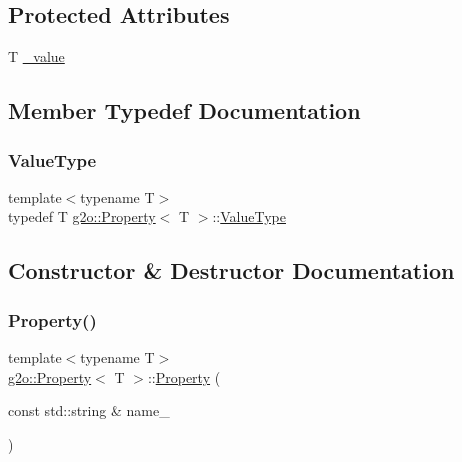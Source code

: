 \subsection*{Protected Attributes}
\begin{DoxyCompactItemize}
\item 
T \mbox{\hyperlink{classg2o_1_1_property_ae51b1fe0e0a1f0d9a2bcbef7ea3afcf7}{\+\_\+value}}
\end{DoxyCompactItemize}


\subsection{Member Typedef Documentation}
\mbox{\label{classg2o_1_1_property_a0387bb74c147b54b8fa4f4cd5629fbf8}} 
\subsubsection{\texorpdfstring{Value\+Type}{ValueType}}
{\footnotesize\ttfamily template$<$typename T$>$ \\
typedef T \mbox{\hyperlink{classg2o_1_1_property}{g2o\+::\+Property}}$<$ T $>$\+::\mbox{\hyperlink{classg2o_1_1_property_a0387bb74c147b54b8fa4f4cd5629fbf8}{Value\+Type}}}



\subsection{Constructor \& Destructor Documentation}
\mbox{\label{classg2o_1_1_property_a15e39f5b08067cff86d2a4f5c838aeee}} 
\subsubsection{\texorpdfstring{Property()}{Property()}\hspace{0.1cm}{\footnotesize\ttfamily [1/2]}}
{\footnotesize\ttfamily template$<$typename T$>$ \\
\mbox{\hyperlink{classg2o_1_1_property}{g2o\+::\+Property}}$<$ T $>$\+::\mbox{\hyperlink{classg2o_1_1_property}{Property}} (\begin{DoxyParamCaption}\item[{const std\+::string \&}]{name\+\_\+ }\end{DoxyParamCaption})\hspace{0.3cm}{\ttfamily [inline]}}

